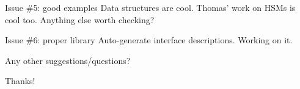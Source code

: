 \documentclass[final,xetex]{beamer}
\begin{document}
\begin{frame}{Issue \#5: good examples}
  Data structures are cool. Thomas' work on HSMs is cool too. Anything else
  worth checking?
\end{frame}

\begin{frame}{Issue \#6: proper library}
  Auto-generate interface descriptions. Working on it.
\end{frame}

\begin{frame}{}
  Any other suggestions/questions?

  \bigskip

  Thanks!
\end{frame}
\end{document}
